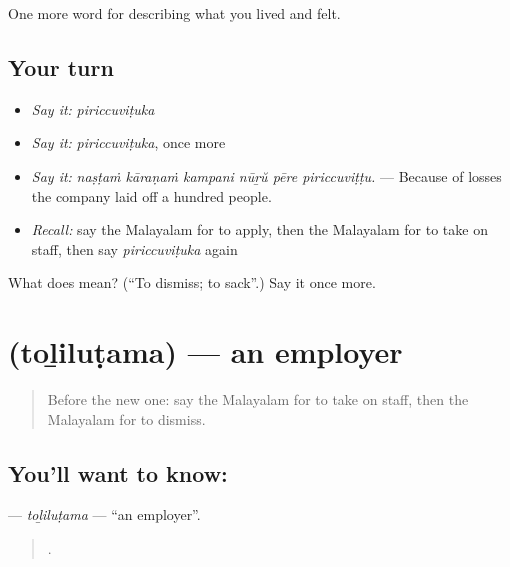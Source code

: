 \begin{grammarlens}[title={What you've built}]
One more word for describing what you lived and felt.
\end{grammarlens}

\subsection*{Your turn}
\begin{itemize}
\raggedright
  \item \emph{Say it:} \emph{piriccuviṭuka}
  \item \emph{Say it:} \emph{piriccuviṭuka}, once more
  \item \emph{Say it:} \emph{naṣṭaṁ kāraṇaṁ kampani nūṟŭ pēre piriccuviṭṭu.} — Because of losses the company laid off a hundred people.
  \item \emph{Recall:} say the Malayalam for to apply, then the Malayalam for to take on staff, then say \emph{piriccuviṭuka} again
\end{itemize}

\begin{tcolorbox}[breakable,colback=teal!4,colframe=teal!35!black,title={Before you move on}]
What does  mean? (\textquotedblleft{}To dismiss; to sack\textquotedblright{}.) Say it once more.
\end{tcolorbox}
\section[\texorpdfstring{\ml{തൊഴിലുടമ} (toḻiluṭama)}{തൊഴിലുടമ (toḻiluṭama)}]{ (toḻiluṭama) — an employer}

\label{lesson:ML-C543-tolilutama}



\begin{quote}
Before the new one: say the Malayalam for to take on staff, then the Malayalam for to dismiss.
\end{quote}

\subsection*{You'll want to know: }
\textbf{} — \emph{toḻiluṭama} — \textquotedblleft{}an employer\textquotedblright{}.

\begin{quote}
   .
\end{quote}

